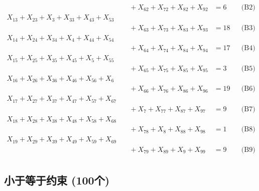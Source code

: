 \documentclass[a4paper,10pt]{article}
\begin{document}
{\begin{align}
&\quad  + X_{62} + X_{72} + X_{82} + X_{92} &= 6 && \text{(B2)} \\
X_{13} + X_{23} + X_{3} + X_{33} + X_{43} + X_{53} \\[0.5ex]
&\quad  + X_{63} + X_{73} + X_{83} + X_{93} &= 18 && \text{(B3)} \\
X_{14} + X_{24} + X_{34} + X_{4} + X_{44} + X_{54} \\[0.5ex]
&\quad  + X_{64} + X_{74} + X_{84} + X_{94} &= 17 && \text{(B4)} \\
X_{15} + X_{25} + X_{35} + X_{45} + X_{5} + X_{55} \\[0.5ex]
&\quad  + X_{65} + X_{75} + X_{85} + X_{95} &= 3 && \text{(B5)} \\
X_{16} + X_{26} + X_{36} + X_{46} + X_{56} + X_{6} \\[0.5ex]
&\quad  + X_{66} + X_{76} + X_{86} + X_{96} &= 19 && \text{(B6)} \\
X_{17} + X_{27} + X_{37} + X_{47} + X_{57} + X_{67} \\[0.5ex]
&\quad  + X_{7} + X_{77} + X_{87} + X_{97} &= 9 && \text{(B7)} \\
X_{18} + X_{28} + X_{38} + X_{48} + X_{58} + X_{68} \\[0.5ex]
&\quad  + X_{78} + X_{8} + X_{88} + X_{98} &= 1 && \text{(B8)} \\
X_{19} + X_{29} + X_{39} + X_{49} + X_{59} + X_{69} \\[0.5ex]
&\quad  + X_{79} + X_{89} + X_{9} + X_{99} &= 9 && \text{(B9)} \\
\allowbreak
\end{align}}

\subsection{小于等于约束 (100个)}
\end{document}
